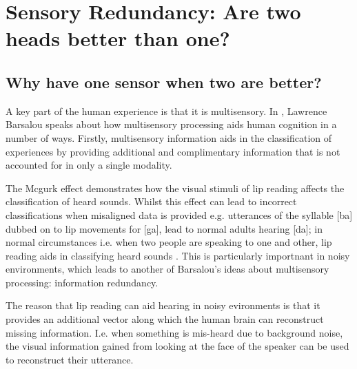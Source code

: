 
\chapter{Sensory Redundancy: Are two heads better than one?} %

\label{Chapter4} %



\section{Why have one sensor when two are better?}
A key part of the human experience is that it is multisensory. In \cite{barsalou2008grounded}, Lawrence Barsalou speaks about how multisensory processing aids human cognition in a number of ways. Firstly, multisensory information aids in the classification of experiences by providing additional and complimentary information that is not accounted for in only a single modality. 

The Mcgurk effect \cite{mcgurk1976hearing} demonstrates how the visual stimuli of lip reading affects the classification of heard sounds. Whilst this effect can lead to incorrect classifications when misaligned data is provided e.g. utterances of the syllable [ba] dubbed on to lip movements for [ga], lead to normal adults hearing [da]; in normal circumstances i.e. when two people are speaking to one and other, lip reading aids in classifying heard sounds \cite{ma2009lip}. This is particularly importnant in noisy environments, which leads to another of Barsalou's ideas about multisensory processing: information redundancy.

The reason that lip reading can aid hearing in noisy evironments is that it provides an additional vector along which the human brain can reconstruct missing information. I.e. when something is mis-heard due to background noise, the visual information gained from looking at the face of the speaker can be used to reconstruct their utterance.

